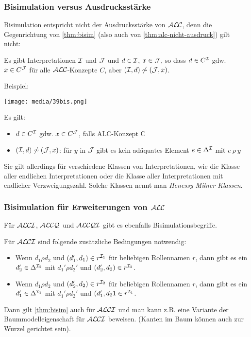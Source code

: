\subsubsection{Bisimulation versus Ausdrucksstärke}\label{bisimulation-versus-ausdrucksstuxe4rke}

Bisimulation entspricht nicht der Ausdrucksstärke von $\mathcal{A}\mathcal{L}\mathcal{C}$, denn die Gegenrichtung von \autoref{thm:bisim} (also auch von \autoref{thm:alc-nicht-ausdruck}) gilt nicht:

Es gibt Interpretationen $\mathcal{I}$ und $\mathcal{J}$ und $d \in \mathcal{I}$, $x \in \mathcal{J}$, so dass $d \in C^{\mathcal{I}}$ gdw. $x \in C^{\mathcal{J}}$ für alle $\mathcal{A}\mathcal{L}\mathcal{C}$-Konzepte $C$, aber $(\mathcal{I},d) \not\sim (\mathcal{J},x)$. 

\begin{tafel}
Beispiel:

\texttt{[image: media/39bis.png]}

Es gilt:

\begin{itemize}
  \item $d \in C^{\mathcal{I}}$ gdw. $x \in C^{\mathcal{J}}$, falls ALC-Konzept C
  \item $(\mathcal{I},d) \not\sim (\mathcal{J},x)$: für $y$ in $\mathcal{J}$ gibt es kein adäquates Element $e \in \Delta^{\mathcal{I}}$ mit $e\ \rho\ y$
\end{itemize}
\end{tafel}

Sie gilt allerdings für verschiedene Klassen von Interpretationen, wie die Klasse aller endlichen Interpretationen oder die Klasse aller Interpretationen mit endlicher Verzweigungszahl. Solche Klassen nennt man \emph{Henessy-Milner-Klassen}.

\subsubsection{Bisimulation für Erweiterungen von \texorpdfstring{$\mathcal{A}\mathcal{L}\mathcal{C}$}{ALC}}\label{bisimulation-in-alc}

Für $\mathcal{A}\mathcal{L}\mathcal{C}\mathcal{I}$, $\mathcal{A}\mathcal{L}\mathcal{C}\mathcal{Q}$ und $\mathcal{A}\mathcal{L}\mathcal{C}\mathcal{Q}\mathcal{I}$ gibt es ebenfalls Bisimulationsbegriffe.

Für $\mathcal{A}\mathcal{L}\mathcal{C}\mathcal{I}$ sind folgende zusätzliche Bedingungen notwendig:
\begin{itemize}
    \item Wenn $d_1 \rho d_2$ und $(d_1', d_1) \in r^{\mathcal{I}_1}$ für beliebigen Rollennamen $r$, dann gibt es ein $d_2' \in \Delta^{\mathcal{I}_2}$ mit $d_1' \rho d_2'$ und $(d_2', d_2) \in r^{\mathcal{I}_2}$.
    \item Wenn $d_1 \rho d_2$ und $(d_2', d_2) \in r^{\mathcal{I}_2}$ für beliebigen Rollennamen $r$, dann gibt es ein $d_1' \in \Delta^{\mathcal{I}_1}$ mit $d_1' \rho d_2'$ und $(d_1', d_21 \in r^{\mathcal{I}_1}$.
\end{itemize}
Dann gilt \autoref{thm:bisim} auch für $\mathcal{A}\mathcal{L}\mathcal{C}\mathcal{I}$ und man kann z.B. eine Variante der Baummodelleigenschaft für $\mathcal{A}\mathcal{L}\mathcal{C}\mathcal{I}$ beweisen. (Kanten im Baum können auch zur Wurzel gerichtet sein).

